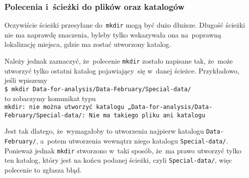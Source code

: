 \documentclass[10pt,t]{beamer}
\begin{document}
\begin{frame}
  \frametitle{Polecenia i~ścieżki do plików oraz katalogów}


  Oczywiście ścieżki przesyłane do~\texttt{mkdir} mogą być dużo dłuższe.
  Długość ścieżki nie ma naprawdę znaczenia, byleby tylko wskazywała ona
  na~poprawną lokalizację miejsca, gdzie ma zostać utworzony katalog.

  Należy jednak zaznaczyć, że~polecenie \texttt{mkdir} zostało napisane tak,
  że~może utworzyć tylko ostatni katalog pojawiający~się w~danej ścieżce.
  Przykładowo, jeśli wpiszemy \\
  \texttt{\$ mkdir Data-for-analysis/Data-February/Special-data/} \\
  to zobaczymy komunikat typu \\
  \texttt{mkdir: nie można utworzyć katalogu
    „Data-for-analysis/Data-February/Special-data/: Nie ma takiego
    pliku ani katalogu}

  Jest tak dlatego, że~wymagałoby to utworzenia najpierw katalogu
  \texttt{Data-February/}, a~potem utworzenia wewnątrz niego katalogu
  \texttt{Special-data/}. Ponieważ jednak \texttt{mkdir} stworzono w~taki
  sposób, że~ma prawo utworzyć tylko ten katalog, który jest na końcu
  podanej ścieżki, czyli \texttt{Special-data/}, więc polecenie to zgłasza
  błąd.


\end{frame}
\end{document}
